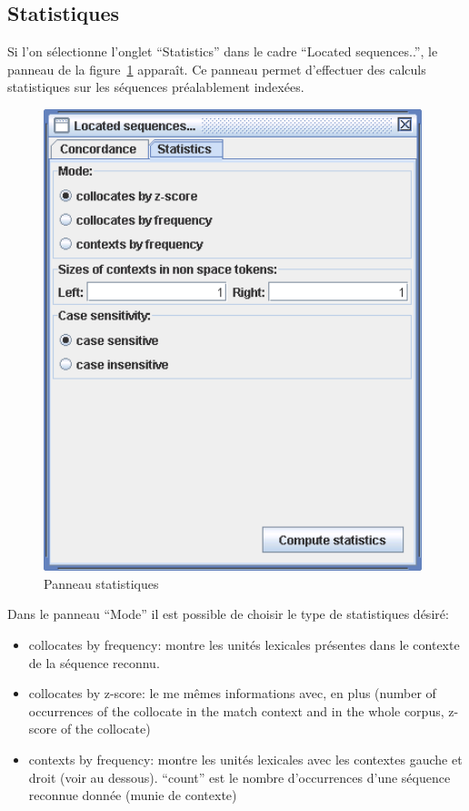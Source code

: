 \clearpage
\subsection{Statistiques}
\label{section-statistics}
Si l'on sélectionne l'onglet ``Statistics'' dans le cadre ``Located sequences..'',
le panneau de la figure~\ref{fig-statistics} apparaît. Ce panneau permet d'effectuer des calculs
statistiques sur les séquences préalablement indexées.

\bigskip
\begin{figure}[!h]
\begin{center}
\includegraphics[width=11cm]{resources/img/fig4-9.png}
\caption{Panneau statistiques \label{fig-statistics}}
\end{center}
\end{figure}

\bigskip
\noindent Dans le panneau ``Mode'' il est possible de choisir le type de statistiques désiré:
\begin{itemize}
  \item collocates by frequency: montre les unités lexicales présentes dans le contexte de la
  	  séquence reconnu.
  \item collocates by z-score: le me mêmes informations avec, en plus (number of occurrences of the collocate in the match context and
  in the whole corpus, z-score of the collocate)
  \item contexts by frequency: montre les unités lexicales avec les contextes gauche et droit
  	  (voir au dessous). ``count'' est le nombre d'occurrences d'une séquence reconnue donnée
  	  (munie de contexte)
\end{itemize}

